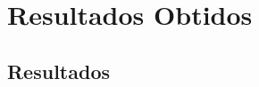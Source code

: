 \chapter{Resultados Obtidos}
\label{Cap:Resultados}
\newcommand{\EscalaAlgumaCoisa}{0.6}


\section{Resultados}








